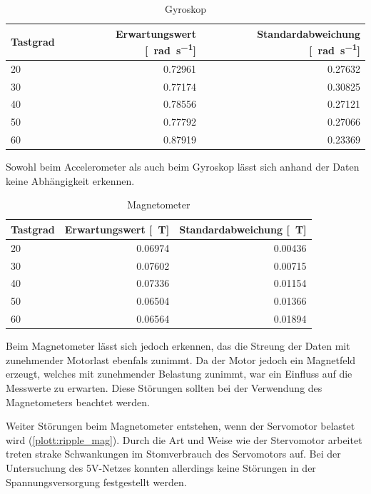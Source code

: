 \begin{table}[H]
  \centering
  \begin{tabularx}{\textwidth}{|X|r|r|}
    \hline
     Tastgrad & Erwartungswert [\SI{}{\radian\per\second}] & Standardabweichung [\SI{}{\radian\per\second}]  \\ \hline \hline
     20 & 0.72961 & 0.27632\\ \hline
     30 & 0.77174 & 0.30825\\ \hline
     40 & 0.78556 & 0.27121\\ \hline
     50 & 0.77792 & 0.27066\\ \hline
     60 & 0.87919 & 0.23369\\ \hline
  \end{tabularx}
  \caption{Gyroskop}%
  \label{tab:gyro}
\end{table}


Sowohl beim Accelerometer als auch beim Gyroskop lässt sich anhand der Daten keine Abhängigkeit erkennen.

\begin{table}[H]
  \centering
  \begin{tabularx}{\textwidth}{|X|r|r|}
    \hline
     Tastgrad & Erwartungswert [\SI{}{\tesla}] & Standardabweichung [\SI{}{\tesla}]  \\ \hline \hline
     20 & 0.06974 & 0.00436\\ \hline
     30 & 0.07602 & 0.00715\\ \hline
     40 & 0.07336 & 0.01154\\ \hline
     50 & 0.06504 & 0.01366\\ \hline
     60 & 0.06564 & 0.01894\\ \hline
  \end{tabularx}
  \caption{Magnetometer}%
  \label{tab:mag}
\end{table}

Beim Magnetometer lässt sich jedoch erkennen, das die Streung der Daten mit zunehmender Motorlast ebenfals zunimmt. Da der Motor jedoch ein Magnetfeld
erzeugt, welches mit zunehmender Belastung zunimmt, war ein Einfluss auf die Messwerte zu erwarten. Diese Störungen sollten bei der Verwendung
des Magnetometers beachtet werden.


Weiter Störungen beim Magnetometer entstehen, wenn der Servomotor belastet wird (\cref{plott:ripple_mag}). Durch die Art und Weise wie der Stervomotor arbeitet treten strake Schwankungen im Stomverbrauch des Servomotors auf.
Bei der Untersuchung des 5V-Netzes konnten allerdings keine Störungen in der Spannungsversorgung festgestellt werden.


